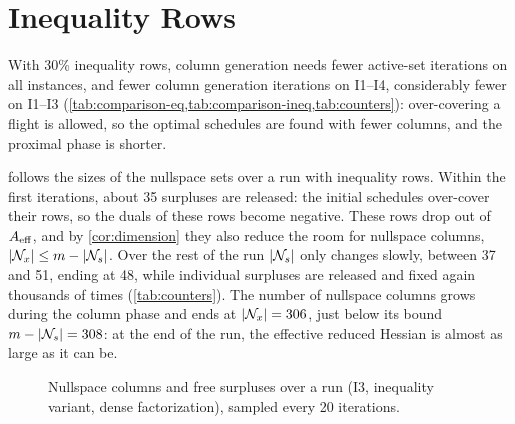 \section{Inequality Rows}
\label{sec:results-ineq}

With 30\% inequality rows, column generation needs fewer active-set iterations on all
instances, and fewer column generation iterations on I1--I4, considerably fewer on I1--I3
(\cref{tab:comparison-eq,tab:comparison-ineq,tab:counters}): over-covering a flight is allowed, so the
optimal schedules are found with fewer columns, and the proximal phase is shorter.

\medskip

 follows the sizes of the nullspace sets over a run with inequality rows.
Within the first iterations, about 35 surpluses are released: the initial schedules
over-cover their rows, so the duals of these rows become negative. These rows drop out of
$A_{\mathrm{eff}}$, and by \cref{cor:dimension} they also reduce the room for nullspace columns,
$|\mathcal{N}_x|\le m - |\mathcal{N}_s|$. Over the rest of the run $|\mathcal{N}_s|$ only changes slowly, between 37 and 51,
ending at 48, while individual surpluses are released and fixed again thousands of times
(\cref{tab:counters}). The number of nullspace columns grows during the column phase and ends
at $|\mathcal{N}_x| = 306$, just below its bound $m - |\mathcal{N}_s| = 308$: at the end of the run, the effective
reduced Hessian is almost as large as it can be.

\begin{figure}[ht]
\centering
{}
\caption{Nullspace columns and free surpluses over a run (I3, inequality variant, dense
factorization), sampled every 20 iterations.}
\label{fig:sets}
\end{figure}

